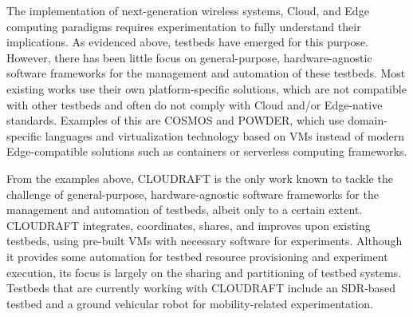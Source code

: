 
\medskip

The implementation of next-generation wireless systems, Cloud, and Edge computing paradigms requires experimentation to fully understand their implications.
As evidenced above, testbeds have emerged for this purpose.
However, there has been little focus on general-purpose, hardware-agnostic software frameworks for the management and automation of these testbeds.
Most existing works use their own platform-specific solutions, which are not compatible with other testbeds and often do not comply with Cloud and/or Edge-native standards.
Examples of this are \gls{COSMOS} and \gls{POWDER}, which use domain-specific languages and virtualization technology based on \glspl{VM} instead of modern Edge-compatible solutions such as containers or serverless computing frameworks.

From the examples above, \gls{CLOUDRAFT} is the only work known to tackle the challenge of general-purpose, hardware-agnostic software frameworks for the management and automation of testbeds, albeit only to a certain extent.
\gls{CLOUDRAFT} integrates, coordinates, shares, and improves upon existing testbeds, using pre-built VMs with necessary software for experiments.
Although it provides some automation for testbed resource provisioning and experiment execution, its focus is largely on the sharing and partitioning of testbed systems.
Testbeds that are currently working with \gls{CLOUDRAFT} include an \gls{SDR}-based testbed and a ground vehicular robot for mobility-related experimentation.

